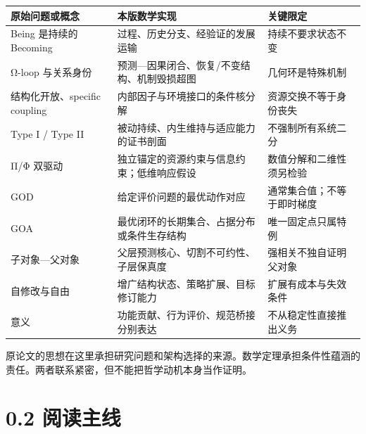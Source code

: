 \documentclass[
  11pt,
  oneside]{book}
\newcounter{none} %
\begin{document}
{\def\LTcaptype{none} %
\begin{longtable}[]{@{}
  >{\raggedright\arraybackslash}p{}
  >{\raggedright\arraybackslash}p{}
  >{\raggedright\arraybackslash}p{}@{}}
\toprule\noalign{}
\begin{minipage}[b]{\linewidth}\raggedright
原始问题或概念
\end{minipage} & \begin{minipage}[b]{\linewidth}\raggedright
本版数学实现
\end{minipage} & \begin{minipage}[b]{\linewidth}\raggedright
关键限定
\end{minipage} \\
\midrule\noalign{}
\endhead
\bottomrule\noalign{}
\endlastfoot
Being 是持续的 Becoming & 过程、历史分支、经验证的发展运输 & 持续不要求状态不变 \\
Ω-loop 与关系身份 & 预测---因果闭合、恢复/不变结构、机制毁损超图 & 几何环是特殊机制 \\
结构化开放、specific coupling & 内部因子与环境接口的条件核分解 & 资源交换不等于身份丧失 \\
Type I / Type II & 被动持续、内生维持与适应能力的证书剖面 & 不强制所有系统二分 \\
Π/Φ 双驱动 & 独立锚定的资源约束与信息约束；低维响应假设 & 数值分解和二维性须另检验 \\
GOD & 给定评价问题的最优动作对应 & 通常集合值；不等于即时梯度 \\
GOA & 最优闭环的长期集合、占据分布或条件生存结构 & 唯一固定点只属特例 \\
子对象---父对象 & 父层预测核心、切割不可约性、子层保真度 & 强相关不独自证明父对象 \\
自修改与自由 & 增广结构状态、策略扩展、目标修订能力 & 扩展有成本与失效条件 \\
意义 & 功能贡献、行为评价、规范桥接分别表达 & 不从稳定性直接推出义务 \\
\end{longtable}
}

原论文的思想在这里承担研究问题和架构选择的来源。数学定理承担条件性蕴涵的责任。两者联系紧密，但不能把哲学动机本身当作证明。

\section{0.2 阅读主线}\label{ux9605ux8bfbux4e3bux7ebf}
\end{document}

